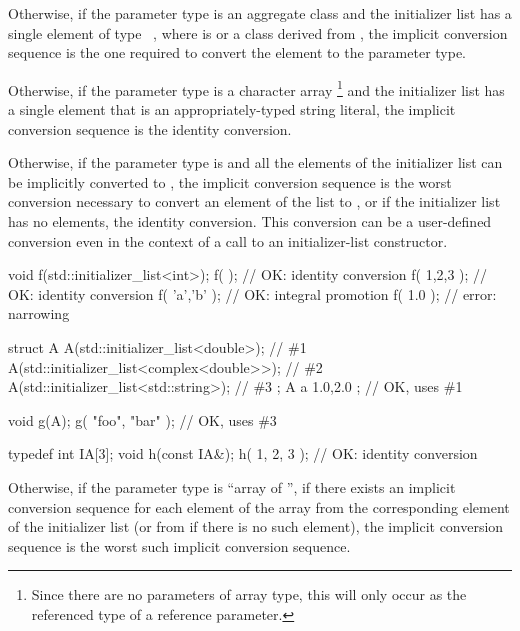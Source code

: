 \pnum
Otherwise,
if the parameter type is an aggregate class  and the initializer list has a
single element of type \cv{}~, where  is 
or a class derived from , the implicit conversion sequence is the one
required to convert the element to the parameter type.

\pnum
Otherwise, if the parameter type is a character array%
\footnote{Since there are no parameters of array type,
this will only occur as the referenced type of a reference parameter.}
and the initializer list has a single element that is an appropriately-typed
string literal, the implicit conversion
sequence is the identity conversion.

\pnum
Otherwise, if the parameter type is 
and all the elements
of the initializer list can be implicitly converted to , the implicit
conversion sequence is the worst conversion necessary to convert an element of
the list to , or if the initializer list has no elements, the identity
conversion. This conversion can be a user-defined conversion even in
the context of a call to an initializer-list constructor. \begin{example}
\begin{codeblock}
void f(std::initializer_list<int>);
f( {} );                        // OK:  identity conversion
f( {1,2,3} );                   // OK:  identity conversion
f( {'a','b'} );                 // OK:  integral promotion
f( {1.0} );                     // error: narrowing

struct A {
  A(std::initializer_list<double>);             // \#1
  A(std::initializer_list<complex<double>>);    // \#2
  A(std::initializer_list<std::string>);        // \#3
};
A a{ 1.0,2.0 };                 // OK, uses \#1

void g(A);
g({ "foo", "bar" });            // OK, uses \#3

typedef int IA[3];
void h(const IA&);
h({ 1, 2, 3 });                 // OK: identity conversion
\end{codeblock}
\end{example}

\pnum
Otherwise, if the parameter type is ``array of  '',
if there exists an implicit conversion sequence for each element of the array
from the corresponding element of the initializer list (or from \tcode{\{\}}
if there is no such element), the implicit conversion sequence is
the worst such implicit conversion sequence.

